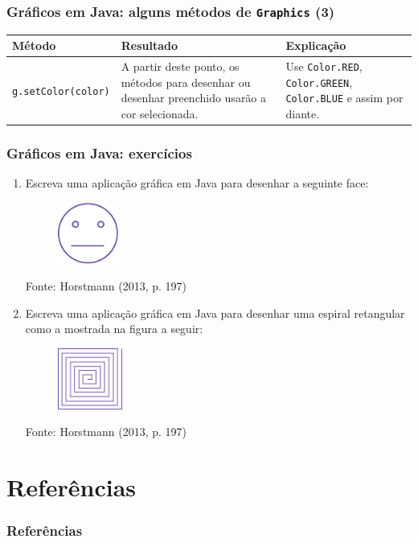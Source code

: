 \documentclass[xcolor={dvipsnames,table},aspectratio=169]{beamer}
\begin{document}
\begin{frame}[fragile]\frametitle{Gráficos em Java: alguns métodos de \texttt{Graphics} (3)}
{\scriptsize
\begin{center}
  \begin{tabular}{|p{6cm}|p{3cm}|p{4cm}|}
\hline
    \textbf{Método} & \textbf{Resultado} & \textbf{Explicação} \\
\hline
\texttt{g.setColor(color)}
&
A partir deste ponto, os métodos para desenhar ou desenhar preenchido usarão a cor selecionada.
& Use \texttt{Color.RED}, \texttt{Color.GREEN}, \texttt{Color.BLUE} e assim por diante.\\
\hline
  \end{tabular}
\end{center}
}
\end{frame}

\begin{frame}\frametitle{Gráficos em Java: exercícios}
\begin{enumerate}
	\item Escreva uma aplicação gráfica em Java para desenhar a seguinte face:
	\begin{figure}[h]
		\includegraphics[height=2cm,center]{pucrs-ep-fprog-unidade_04-lacos-laminas-exercicio_1.png}
	\end{figure}
	{\tiny Fonte: Horstmann (2013, p. 197)}
	\item Escreva uma aplicação gráfica em Java para desenhar uma espiral retangular como a mostrada na figura a seguir:
	\begin{figure}[h]
		\includegraphics[height=2cm,center]{pucrs-ep-fprog-unidade_04-lacos-laminas-exercicio_2.png}
	\end{figure}
	{\tiny Fonte: Horstmann (2013, p. 197)}
\end{enumerate}
\end{frame}

\section{Referências}

\begin{frame}\frametitle{Referências}
\end{frame}

\end{document}
